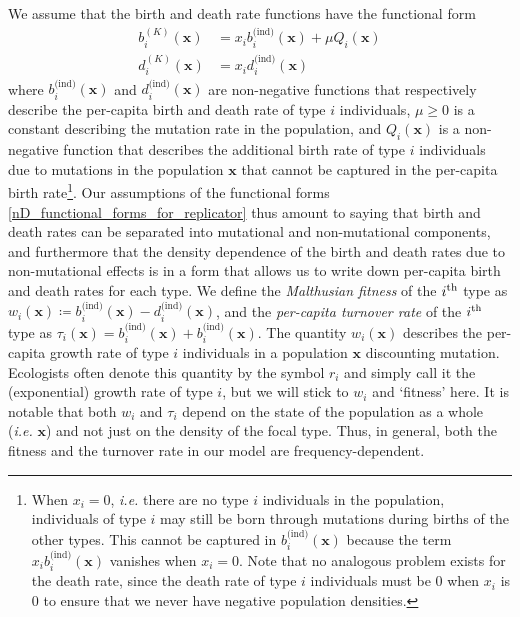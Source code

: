 We assume that the birth and death rate functions have the functional form
\begin{equation}
\label{nD_functional_forms_for_replicator}
\begin{aligned}
b^{(K)}_i(\mathbf{x}) &= x_ib^{\textrm{(ind)}}_{i}(\mathbf{x}) + \mu Q_i(\mathbf{x})\\
d^{(K)}_i(\mathbf{x}) &= x_id^{\textrm{(ind)}}_i(\mathbf{x})
\end{aligned}
\end{equation}
where $b^{\textrm{(ind)}}_{i}(\mathbf{x})$ and $d^{\textrm{(ind)}}_{i}(\mathbf{x})$ are non-negative functions that respectively describe the per-capita birth and death rate of type $i$ individuals, $\mu \geq 0$ is a constant describing the mutation rate in the population, and $Q_i(\mathbf{x})$ is a non-negative function that describes the additional birth rate of type $i$ individuals due to mutations in the population $\mathbf{x}$ that cannot be captured in the per-capita birth rate\footnote{When $x_i = 0$, \emph{i.e.} there are no type $i$ individuals in the population, individuals of type $i$ may still be born through mutations during births of the other types. This cannot be captured in $b^{\textrm{(ind)}}_{i}(\mathbf{x})$ because the term $x_ib^{\textrm{(ind)}}_{i}(\mathbf{x})$ vanishes when $x_i = 0$. Note that no analogous problem exists for the death rate, since the death rate of type $i$ individuals must be 0 when $x_i$ is 0 to ensure that we never have negative population densities.}. Our assumptions of the functional forms \eqref{nD_functional_forms_for_replicator} thus amount to saying that birth and death rates can be separated into mutational and non-mutational components, and furthermore that the density dependence of the birth and death rates due to non-mutational effects is in a form that allows us to write down per-capita birth and death rates for each type. We define the \emph{Malthusian fitness} of the $i\textsuperscript{th}$ type as $w_i(\mathbf{x}) \coloneqq b^{\textrm{(ind)}}_{i}(\mathbf{x}) - d^{\textrm{(ind)}}_{i}(\mathbf{x})$, and the \emph{per-capita turnover rate} of the $i\textsuperscript{th}$ type as $\tau_i(\mathbf{x}) = b^{\textrm{(ind)}}_{i}(\mathbf{x}) + b^{\textrm{(ind)}}_{i}(\mathbf{x})$.  The quantity $w_i(\mathbf{x})$ describes the per-capita growth rate of type $i$ individuals in a population $\mathbf{x}$ discounting mutation. Ecologists often denote this quantity by the symbol $r_i$ and simply call it the (exponential) growth rate of type $i$, but we will stick to $w_i$ and `fitness' here. It is notable that both $w_i$ and $\tau_i$ depend on the state of the population as a whole (\textit{i.e.} $\mathbf{x}$) and not just on the density of the focal type. Thus, in general, both the fitness and the turnover rate in our model are frequency-dependent.\\

